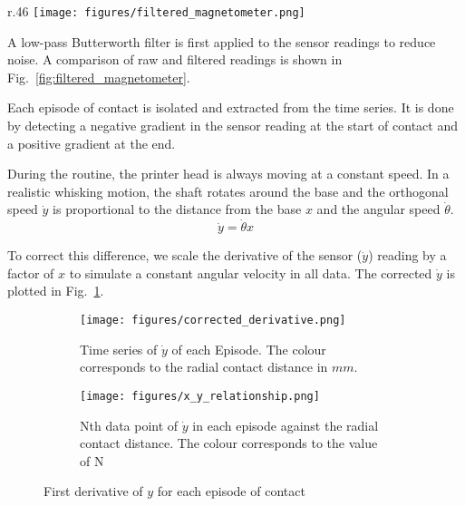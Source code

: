 \documentclass[runningheads]{llncs}
\begin{document}
\begin{wrapfigure}{r}{.46\textwidth}
    \centering
    \texttt{[image: figures/filtered\_magnetometer.png]}
    \caption{Raw and Filtered Magnetometer Reading in the Y-Axis }
    \label{fig:filtered_magnetometer}
\end{wrapfigure}

A low-pass Butterworth filter is first applied to the sensor readings to reduce noise. A comparison of raw and filtered readings is shown in Fig.~\ref{fig:filtered_magnetometer}.

Each episode of contact is isolated and extracted from the time series. It is done by detecting a negative gradient in the sensor reading at the start of contact and a positive gradient at the end. 

During the routine, the printer head is always moving at a constant speed. In a realistic whisking motion, the shaft rotates around the base and the orthogonal speed \(\dot{y}\) is proportional to the distance from the base \(x\) and the angular speed \(\dot{\theta}\).
\begin{equation}\label{eq:linear_relationship}
\dot{y} = \dot{\theta}x
\end{equation}

To correct this difference, we scale the derivative of the sensor (\(\dot{y}\)) reading by a factor of \(x\) to simulate a constant angular velocity in all data. The corrected \(\dot{y}\) is plotted in Fig.~\ref{fig:corrected_derivative.png}.

\begin{figure}
    \centering
    \begin{subfigure}[t]{.49\textwidth}
        \centering
        \texttt{[image: figures/corrected\_derivative.png]}
        \caption{Time series of \(\dot{y}\) of each Episode. The colour corresponds to the radial contact distance in $mm$.}
        \label{fig:corrected_derivative.png}
    \end{subfigure}
    \hspace{1pt}
    \begin{subfigure}[t]{.49\textwidth}
        \centering
        \texttt{[image: figures/x\_y\_relationship.png]}
        \caption{Nth data point of \(\dot{y}\) in each episode against the radial contact distance. The colour corresponds to the value of N}
        \label{fig:x_y_relationship.png}
    \end{subfigure}
    \caption{First derivative of \(y\) for each episode of contact}
    \label{fig:episode_analysis}
\end{figure}
\end{document}
